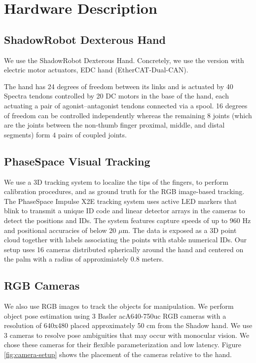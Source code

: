 \section{Hardware Description}
\label{app:hardware}



\subsection{ShadowRobot Dexterous Hand}

We use the ShadowRobot Dexterous Hand. Concretely, we use the version with electric motor actuators, EDC hand (EtherCAT-Dual-CAN).

The hand has \num{24} degrees of freedom between its links and is actuated by \num{40} Spectra tendons controlled by \num{20} DC motors in the base of the hand, each actuating a pair of agonist--antagonist tendons connected via a spool.
\num{16} degrees of freedom can be controlled independently whereas the remaining \num{8} joints (which are the joints between the non-thumb finger proximal, middle, and distal segments) form $4$ pairs of coupled joints.

\subsection{PhaseSpace Visual Tracking}
We use a 3D tracking system to localize the tips of the fingers, to perform calibration procedures, and as ground truth for the RGB image-based tracking. The PhaseSpace Impulse X2E tracking system uses active LED markers that blink to transmit a unique ID code and linear detector arrays in the cameras to detect the positions and IDs. The system features capture speeds of up to 960 Hz and positional accuracies of below 20 $\mu$m. The data is exposed as a 3D point cloud together with labels associating the points with stable numerical IDs. Our setup uses 16 cameras distributed spherically around the hand and centered on the palm with a radius of approximiately $0.8$ meters.


\subsection{RGB Cameras} \label{app:cameras}
We also use RGB images to track the objects for manipulation. We perform object pose estimation using 3 Basler acA640-750uc RGB cameras with a resolution of 640x480 placed approximately 50 cm from the Shadow hand. We use 3 cameras to resolve pose ambiguities that may occur with monocular vision. We chose these cameras for their flexible parameterization and low latency. Figure \ref{fig:camera-setup} shows the placement of the cameras relative to the hand.

